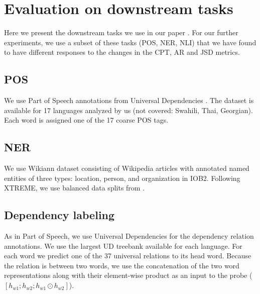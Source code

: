 



\section{Evaluation on downstream tasks}

Here we present the downstream tasks we use in our paper \cite{limisiewicz_tokenization_2023}. For our further experiments, we use a subset of these tasks (POS, NER, NLI) that we have found to have different responses to the changes in the CPT, AR and JSD metrics.

\subsection{POS}

We use Part of Speech annotations from Universal Dependencies \cite{nivre_universal_2020}. The dataset is available for 17 languages analyzed by us (not covered: Swahili, Thai, Georgian). Each word is assigned one of the 17 coarse POS tags.

\subsection{NER}

We use Wikiann dataset \cite{pan_cross-lingual_2017} consisting of Wikipedia articles with annotated named entities of three types: location, person, and organization in IOB2. Following XTREME, we use balanced data splits from \cite{rahimi_massively_2019}.

\subsection{Dependency labeling}

As in Part of Speech, we use Universal Dependencies \cite{nivre_universal_2020} for the dependency relation annotations. We use the largest UD treebank available for each language.
For each word we predict one of the 37 universal relations to its head word. Because the relation is between two words, we use the concatenation of the two word representations along with their element-wise product as an input to the probe ($[h_{w1}; h_{w2}; h_{w1} \odot h_{w2}]$).

